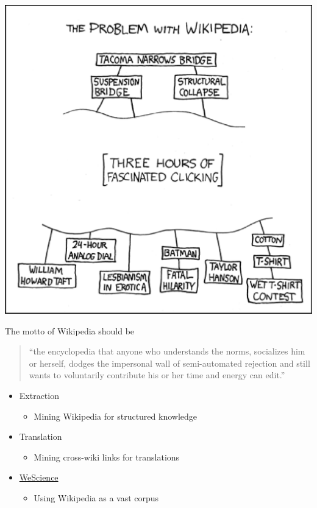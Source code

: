 \documentclass[a4paper,landscape,headrule,footrule,xetex]{foils}
\begin{document}
\begin{center}
  \includegraphics[height=\textheight]{../pics/xkcd-problem_wiki}
\end{center}


\begin{large}
  The motto of Wikipedia should be 
  \begin{quote}
    ``the encyclopedia that anyone who understands the norms,
    socializes him or herself, dodges the impersonal wall of
    semi-automated rejection and still wants to voluntarily contribute
    his or her time and energy can edit.''
  \end{quote}
\end{large}

\MyLogo{}

\begin{itemize}
\item Extraction
  \begin{itemize}
  \item Mining Wikipedia for structured knowledge
  \end{itemize}
\item Translation
  \begin{itemize}
  \item Mining cross-wiki links for translations 
  \end{itemize}
\item \href{http://moin.delph-in.net/WeScience}{WeScience}
  \begin{itemize}
  \item Using Wikipedia as a vast corpus
  \end{itemize}
\end{itemize}
\end{document}
